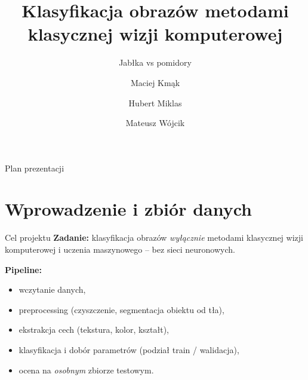 \documentclass[aspectratio=1610, polish]{beamer}
\author[Kmąk, Miklas, Wójcik]{Maciej Kmąk \and Hubert Miklas \and Mateusz Wójcik}
\date{}
\title{Klasyfikacja obrazów metodami klasycznej wizji komputerowej}
\subtitle{Jabłka vs pomidory}
\institute[AGH]{
        Akademia Górniczo-Hutnicza \\
        Systemy Wizyjne
}
\begin{document}
\begin{frame}[t]
    \maketitle
\end{frame}

\begin{frame}{Plan prezentacji}
    \tableofcontents
\end{frame}

\section{Wprowadzenie i zbiór danych}
\begin{frame}{Cel projektu}
    \textbf{Zadanie:} klasyfikacja obrazów \emph{wyłącznie} metodami klasycznej
    wizji komputerowej i uczenia maszynowego -- bez sieci neuronowych.
    \pause
    \vspace{0.5cm}

    \textbf{Pipeline:}
    \begin{itemize}
        \item wczytanie danych,
        \item preprocessing (czyszczenie, segmentacja obiektu od tła),
        \item ekstrakcja cech (tekstura, kolor, kształt),
        \item klasyfikacja i dobór parametrów (podział train / walidacja),
        \item ocena na \emph{osobnym} zbiorze testowym.
    \end{itemize}
\end{frame}
\end{document}
